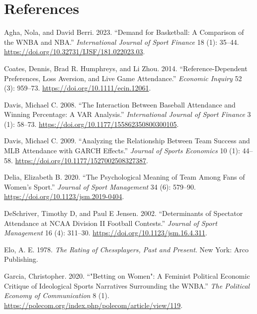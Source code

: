 \documentclass[
  letterpaper,
  DIV=11,
  numbers=noendperiod]{scrartcl}
\newlength{\cslhangindent}
\newenvironment{CSLReferences}[2] %
 {\begin{list}{}{%
  \setlength{\itemindent}{0pt}
  \setlength{\leftmargin}{0pt}
  \setlength{\parsep}{0pt}
  \ifodd #1
   \setlength{\leftmargin}{\cslhangindent}
   \setlength{\itemindent}{-1\cslhangindent}
  \fi
  \setlength{\itemsep}{#2\baselineskip}}}
 {\end{list}}
\begin{document}
\section*{References}\label{references}

\protect{}\label{refs}
\begin{CSLReferences}{1}{1}
Agha, Nola, and David Berri. 2023. {``Demand for Basketball: A
Comparison of the WNBA and NBA.''} \emph{International Journal of Sport
Finance} 18 (1): 35--44.
\url{https://doi.org/10.32731/IJSF/181.022023.03}.

Coates, Dennis, Brad R. Humphreys, and Li Zhou. 2014.
{``Reference-Dependent Preferences, Loss Aversion, and Live Game
Attendance.''} \emph{Economic Inquiry} 52 (3): 959--73.
\url{https://doi.org/10.1111/ecin.12061}.

Davis, Michael C. 2008. {``The Interaction Between Baseball Attendance
and Winning Percentage: A VAR Analysis.''} \emph{International Journal
of Sport Finance} 3 (1): 58--73.
\url{https://doi.org/10.1177/155862350800300105}.

Davis, Michael C. 2009. {``Analyzing the Relationship Between Team
Success and MLB Attendance with GARCH Effects.''} \emph{Journal of
Sports Economics} 10 (1): 44--58.
\url{https://doi.org/10.1177/1527002508327387}.

Delia, Elizabeth B. 2020. {``The Psychological Meaning of Team Among
Fans of Women's Sport.''} \emph{Journal of Sport Management} 34 (6):
579--90. \url{https://doi.org/10.1123/jsm.2019-0404}.

DeSchriver, Timothy D, and Paul E Jensen. 2002. {``Determinants of
Spectator Attendance at NCAA Division II Football Contests.''}
\emph{Journal of Sport Management} 16 (4): 311--30.
\url{https://doi.org/10.1123/jsm.16.4.311}.

Elo, A. E. 1978. \emph{The Rating of Chessplayers, Past and Present}.
New York: Arco Publishing.

Garcia, Christopher. 2020. {``"Betting on Women": A Feminist Political
Economic Critique of Ideological Sports Narratives Surrounding the
WNBA.''} \emph{The Political Economy of Communication} 8 (1).
\url{https://polecom.org/index.php/polecom/article/view/119}.


\end{CSLReferences}
\end{document}
